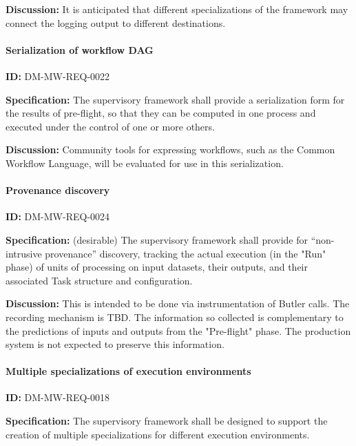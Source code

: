\documentclass[SE,toc,lsstdraft]{lsstdoc}
\begin{document}
\textbf{Discussion:}
It is anticipated that different specializations of the framework may connect the logging output to different destinations.




\paragraph{Serialization of workflow DAG}\hfill  %

\label{DM-MW-REQ-0022}
\textbf{ID:} DM-MW-REQ-0022

\textbf{Specification:}
The supervisory framework shall provide a serialization form for the results of pre-flight, so that they can be computed in one process and executed under the control of one or more others.

\textbf{Discussion:}
Community tools for expressing workflows, such as the Common Workflow Language, will be evaluated for use in this serialization.




\paragraph{Provenance discovery}\hfill  %

\label{DM-MW-REQ-0024}
\textbf{ID:} DM-MW-REQ-0024

\textbf{Specification:}
(desirable) The supervisory framework shall provide for “non-intrusive provenance” discovery, tracking the actual execution (in the "Run" phase) of units of processing on input datasets, their outputs, and their associated Task structure and configuration.

\textbf{Discussion:}
This is intended to be done via instrumentation of Butler calls. The recording mechanism is TBD. The information so collected is complementary to the predictions of inputs and outputs from the "Pre-flight" phase. The production system is not expected to preserve this information.




\paragraph{Multiple specializations of execution environments}\hfill  %

\label{DM-MW-REQ-0018}
\textbf{ID:} DM-MW-REQ-0018

\textbf{Specification:}
The supervisory framework shall be designed to support the creation of multiple specializations for different execution environments.
\end{document}
